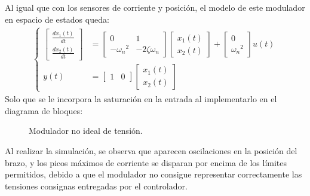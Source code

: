\documentclass[a4paper, 10pt, onecolumn,journal]{ieeeconf}
\begin{document}
Al igual que con los sensores de corriente y posición, el modelo de este modulador en espacio de estados queda:
\begin{align}
	\begin{cases}
		\begin{bmatrix}
			\frac{d x_1(t)}{dt} \\ 
			\frac{d x_2(t)}{dt}
		\end{bmatrix} &= 
		\begin{bmatrix}
			0 & 1 \\ 
			-{\omega_n}^2 & - 2 \zeta \omega_n
		\end{bmatrix}
		\begin{bmatrix}
			x_1(t) \\ 
			x_2(t)
		\end{bmatrix} + 
		\begin{bmatrix}
			0 \\
			{\omega_n}^2
		\end{bmatrix} u(t) \\
		y(t) &= \begin{bmatrix}
			1 & 0
		\end{bmatrix} 
		\begin{bmatrix}
			x_1(t) \\ 
			x_2(t)
		\end{bmatrix}
	\end{cases}\label{ecuacion matricial de modulador de tension real}
\end{align}
Solo que se le incorpora la saturación en la entrada al implementarlo en el diagrama de bloques:
\begin{figure}[H]
	\centering
	\begin{adjustbox}{scale=0.5,max width=\columnwidth}
	\end{adjustbox}
	\caption{Modulador no ideal de tensión.}
	\label{Modulador no ideal de tensión}
\end{figure}
Al realizar la simulación, se observa que aparecen oscilaciones en la posición  del brazo, y los picos máximos de corriente se disparan por encima de los límites permitidos, debido a que el modulador no consigue representar correctamente las tensiones consignas entregadas por el controlador.
\end{document}
